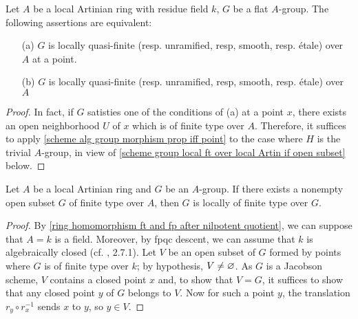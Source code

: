 \begin{corollary}\label{scheme alg group prop iff at point}
Let $A$ be a local Artinian ring with residue field $k$, $G$ be a flat $A$-group. The following assertions are equivalent:
\begin{enumerate}
    \item[(a)] $G$ is locally quasi-finite (resp. unramified, resp, smooth, resp. \'etale) over $A$ at a point.
    \item[(b)] $G$ is locally quasi-finite (resp. unramified, resp, smooth, resp. \'etale) over $A$
\end{enumerate}
\end{corollary}
\begin{proof}
In fact, if $G$ satisties one of the conditions of (a) at a point $x$, there exists an open neighborhood $U$ of $x$ which is of finite type over $A$. Therefore, it suffices to apply \cref{scheme alg group morphism prop iff point} to the case where $H$ is the trivial $A$-group, in view of \cref{scheme group local ft over local Artin if open subset} below.
\end{proof}

\begin{lemma}\label{scheme group local ft over local Artin if open subset}
Let $A$ be a local Artinian ring and $G$ be an $A$-group. If there exists a nonempty open subset $G$ of finite type over $A$, then $G$ is locally of finite type over $G$.
\end{lemma}
\begin{proof}
By \cref{ring homomorphism ft and fp after nilpotent quotient}, we can suppose that $A=k$ is a field. Moreover, by fpqc descent, we can assume that $k$ is algebraically closed (cf. \cite{EGA4-2}, 2.7.1). Let $V$ be an open subset of $G$ formed by points where $G$ is of finite type over $k$; by hypothesis, $V\neq\varnothing$. As $G$ is a Jacobson scheme, $V$ contains a closed point $x$ and, to show that $V=G$, it suffices to show that any closed point $y$ of $G$ belongs to $V$. Now for such a point $y$, the translation $r_y\circ r_x^{-1}$ sends $x$ to $y$, so $y\in V$.
\end{proof}

